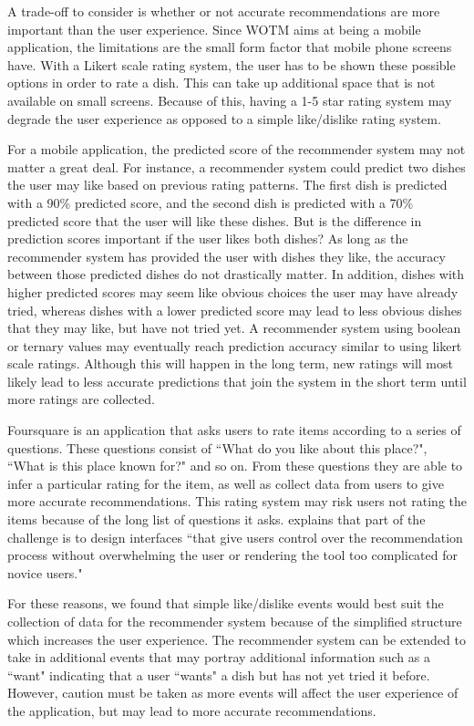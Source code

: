 A trade-off to consider is whether or not accurate recommendations are more important than the user experience. Since WOTM aims at being a mobile application, the limitations are the small form factor that mobile phone screens have. With a Likert scale rating system, the user has to be shown these possible options in order to rate a dish. This can take up additional space that is not available on small screens. Because of this, having a 1-5 star rating system may degrade the user experience as opposed to a simple like/dislike rating system. 

For a mobile application, the predicted score of the recommender system may not matter a great deal. For instance, a recommender system could predict two dishes the user may like based on previous rating patterns. The first dish is predicted with a 90\% predicted score, and the second dish is predicted with a 70\% predicted score that the user will like these dishes. But is the difference in prediction scores important if the user likes both dishes? As long as the recommender system has provided the user with dishes they like, the accuracy between those predicted dishes do not drastically matter. In addition, dishes with higher predicted scores may seem like obvious choices the user may have already tried, whereas dishes with a lower predicted score may lead to less obvious dishes that they may like, but have not tried yet. A recommender system using boolean or ternary values may eventually reach prediction accuracy similar to using likert scale ratings. Although this will happen in the long term, new ratings will most likely lead to less accurate predictions that join the system in the short term until more ratings are collected. 

Foursquare \cite{foursquare} is an application that asks users to rate items according to a series of questions. These questions consist of ``What do you like about this place?", ``What is this place known for?" and so on. From these questions they are able to infer a particular rating for the item, as well as collect data from users to give more accurate recommendations. This rating system may risk users not rating the items because of the long list of questions it asks. \cite{martin2009recsys} explains that part of the challenge is to design interfaces ``that give users control over the recommendation process without overwhelming the user or rendering the tool too complicated for novice users." 

For these reasons, we found that simple like/dislike events would best suit the collection of data for the recommender system because of the simplified structure which increases the user experience. The recommender system can be extended to take in additional events that may portray additional information such as a ``want" indicating that a user ``wants" a dish but has not yet tried it before. However, caution must be taken as more events will affect the user experience of the application, but may lead to more accurate recommendations. 

